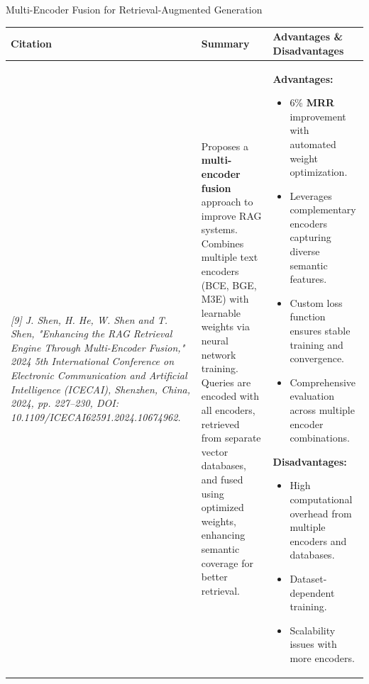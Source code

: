 \begin{frame}{Multi-Encoder Fusion for Retrieval-Augmented Generation}
\scriptsize
\vspace{-0.8em}

\begin{table}[h!]
\centering
\renewcommand{\arraystretch}{1.5} %
\setlength{\tabcolsep}{2.5pt}     %

\begin{tabular}{|p{2.6cm}|p{4.3cm}|p{4.3cm}|}
\hline
\textbf{Citation} & \textbf{Summary} & \textbf{Advantages \& Disadvantages} \\
\hline
\tiny\textit{[9] J. Shen, H. He, W. Shen and T. Shen, "Enhancing the RAG Retrieval Engine Through Multi-Encoder Fusion," 2024 5th International Conference on Electronic Communication and Artificial Intelligence (ICECAI), Shenzhen, China, 2024, pp. 227–230, DOI: 10.1109/ICECAI62591.2024.10674962.}
&
Proposes a \textbf{multi-encoder fusion} approach to improve RAG systems. Combines multiple text encoders (BCE, BGE, M3E) with learnable weights via neural network training. Queries are encoded with all encoders, retrieved from separate vector databases, and fused using optimized weights, enhancing semantic coverage for better retrieval.
&
\textbf{Advantages:}
\begin{itemize}\itemsep0.25em
\item 6\% \textbf{MRR} improvement with automated weight optimization.
\item Leverages complementary encoders capturing diverse semantic features.
\item Custom loss function ensures stable training and convergence.
\item Comprehensive evaluation across multiple encoder combinations.
\end{itemize}

\textbf{Disadvantages:}
\begin{itemize}\itemsep0.25em
\item High computational overhead from multiple encoders and databases.
\item Dataset-dependent training.
\item Scalability issues with more encoders.
\end{itemize} \\
\hline
\end{tabular}
\end{table}
\end{frame}
